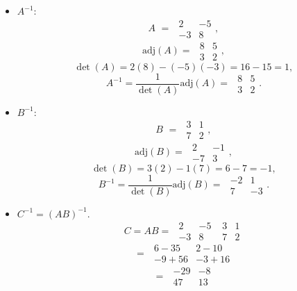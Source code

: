 \documentclass[12pt]{article}
\newcommand{\adj}{\textrm{adj}}
\begin{document}
\begin{itemize}\item $A^{-1}$:
\[ A\hspace{4pt} = \hspace{4pt} \begin{array}{|cc|}2&-5\\-3&8\end{array},\]
\[ \adj(A) = \hspace{4pt} \begin{array}{|cc|}8&5\\3&2\end{array}, \]
\[ \det(A) = 2(8) - (-5)(-3) = 16 - 15 = 1,\]
\[ A^{-1} = \frac{1}{\det(A)}\adj(A) =  \hspace{4pt} \begin{array}{|cc|}8&5\\3&2\end{array}.\]
\item $B^{-1}$:
\[ B\hspace{4pt} = \hspace{4pt}\begin{array}{|cc|}3&1\\7&2\end{array},\]
\[ \adj(B) = \hspace{4pt} \begin{array}{|cc|}2&-1\\-7&3\end{array}, \]
\[ \det(B) = 3(2) - 1(7) = 6 - 7 = - 1,\]
\[ B^{-1} = \frac{1}{\det(B)}\adj(B) =  \hspace{4pt} \begin{array}{|cc|}-2&1\\7&-3\end{array}.\]
\item $C^{-1}= (AB)^{-1}$.
\[ C = AB =  \hspace{4pt} \begin{array}{|cc|}2&-5\\-3&8\end{array} \hspace{4pt} \begin{array}{|cc|}3&1\\7&2\end{array}\]
\[ =  \hspace{4pt} \begin{array}{|cc|}6 - 35&2 - 10\\-9 + 56&- 3 + 16\end{array}\]
\[ =  \hspace{4pt} \begin{array}{|cc|}-29&-8\\47&13\end{array}\]

\end{itemize}
\end{document}

